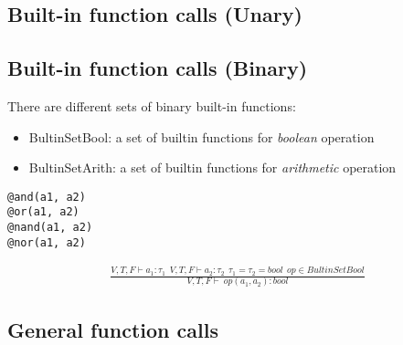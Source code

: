 \subsection{Built-in function calls (Unary)}

\subsection{Built-in function calls (Binary)}

There are different sets of binary built-in functions:

\begin{itemize} %
\item BultinSetBool: a set of builtin functions for \textit{boolean} operation
\item BultinSetArith: a set of builtin functions for \textit{arithmetic} operation
\end{itemize}


\begin{verbatim}
@and(a1, a2)
@or(a1, a2)
@nand(a1, a2)
@nor(a1, a2)
\end{verbatim}


\begin{align*}
\frac
{V,T,F\vdash a_1:\tau_1\ \ V,T,F\vdash a_2:\tau_2\ \ \tau_1=\tau_2=bool\ \ op\in BultinSetBool}
{V,T,F\vdash\ op(a_1,a_2):bool}
\end{align*}

\subsection{General function calls}


































